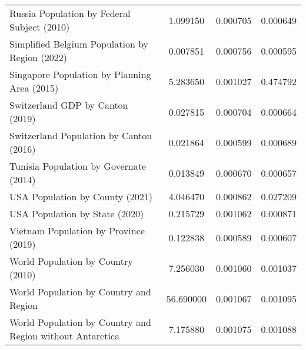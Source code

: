 \begin{tabular}{lccc}
Russia Population by Federal Subject (2010) & 1.099150 & 0.000705 & 0.000649 \\
Simplified Belgium Population by Region (2022) & 0.007851 & 0.000756 & 0.000595 \\
Singapore Population by Planning Area (2015) & 5.283650 & 0.001027 & 0.474792 \\
Switzerland GDP by Canton (2019) & 0.027815 & 0.000704 & 0.000664 \\
Switzerland Population by Canton (2016) & 0.021864 & 0.000599 & 0.000689 \\
Tunisia Population by Governate (2014) & 0.013849 & 0.000670 & 0.000657 \\
USA Population by County (2021) & 4.046470 & 0.000862 & 0.027209 \\
USA Population by State (2020) & 0.215729 & 0.001062 & 0.000871 \\
Vietnam Population by Province (2019) & 0.122838 & 0.000589 & 0.000607 \\
World Population by Country (2010) & 7.256030 & 0.001060 & 0.001037 \\
World Population by Country and Region & 56.690000 & 0.001067 & 0.001095 \\
World Population by Country and Region without Antarctica & 7.175880 & 0.001075 & 0.001088 \\
\bottomrule
\end{tabular}
